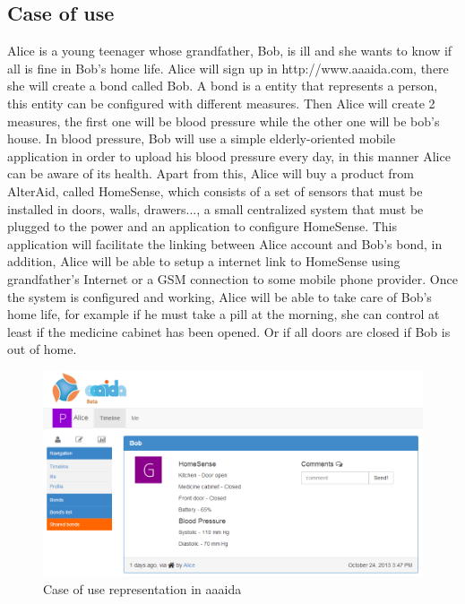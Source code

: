 \subsection{Case of use}\label{SS:Case-Of-Use}
Alice is a young teenager whose grandfather, Bob, is ill and she wants to know if all is fine in Bob's home life. Alice will sign up in http://www.aaaida.com, there she will create a bond called Bob. A bond is a entity that represents a person, this entity can be configured with different measures. Then Alice will create 2 measures, the first one will be blood pressure while the other one will be bob's house.
In blood pressure, Bob will use a simple elderly-oriented mobile application in order to upload his blood pressure every day, in this manner Alice can be aware of its health.
Apart from this, Alice will buy a product from AlterAid, called HomeSense, which consists of a set of sensors that must be installed in doors, walls, drawers..., a small centralized system that must be plugged to the power and an application to configure HomeSense.
This application will facilitate the linking between Alice account and Bob's bond, in addition, Alice will be able to setup a internet link to HomeSense using grandfather's Internet or a GSM connection to some mobile phone provider.
Once the system is configured and working, Alice will be able to take care of Bob's home life, for example if he must take a pill at the morning, she can control at least if the medicine cabinet has been opened. Or if all doors are closed if Bob is out of home.

\begin{figure}[H]\begin{center}
 \centering
  \captionsetup{justification=centering}
  \includegraphics[width=1\textwidth]{pictures/proposal/aaaida-use-case}
  \caption{Case of use representation in aaaida \label{fig:network-architecture}}
\end{center}\end{figure}

